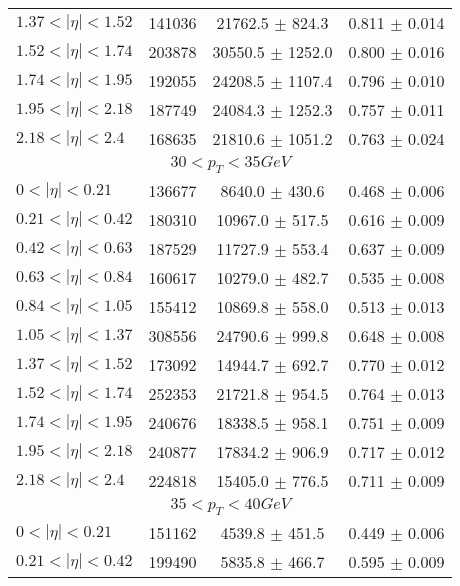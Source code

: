 \begin{tabular}{lccc}
$1.37 < |\eta| <1.52$          & 141036     & 21762.5    $\pm$ 824.3 & 0.811      $\pm$ 0.014 \\
$1.52 < |\eta| <1.74$          & 203878     & 30550.5    $\pm$ 1252.0 & 0.800      $\pm$ 0.016 \\
$1.74 < |\eta| <1.95$          & 192055     & 24208.5    $\pm$ 1107.4 & 0.796      $\pm$ 0.010 \\
$1.95 < |\eta| <2.18$          & 187749     & 24084.3    $\pm$ 1252.3 & 0.757      $\pm$ 0.011 \\
$2.18 < |\eta| <2.4$           & 168635     & 21810.6    $\pm$ 1051.2 & 0.763      $\pm$ 0.024 \\
\hline
\multicolumn{4}{c}{$30 < p_{T} < 35 GeV$} \\
\hline
$0 < |\eta| <0.21$             & 136677     & 8640.0     $\pm$ 430.6 & 0.468      $\pm$ 0.006 \\
$0.21 < |\eta| <0.42$          & 180310     & 10967.0    $\pm$ 517.5 & 0.616      $\pm$ 0.009 \\
$0.42 < |\eta| <0.63$          & 187529     & 11727.9    $\pm$ 553.4 & 0.637      $\pm$ 0.009 \\
$0.63 < |\eta| <0.84$          & 160617     & 10279.0    $\pm$ 482.7 & 0.535      $\pm$ 0.008 \\
$0.84 < |\eta| <1.05$          & 155412     & 10869.8    $\pm$ 558.0 & 0.513      $\pm$ 0.013 \\
$1.05 < |\eta| <1.37$          & 308556     & 24790.6    $\pm$ 999.8 & 0.648      $\pm$ 0.008 \\
$1.37 < |\eta| <1.52$          & 173092     & 14944.7    $\pm$ 692.7 & 0.770      $\pm$ 0.012 \\
$1.52 < |\eta| <1.74$          & 252353     & 21721.8    $\pm$ 954.5 & 0.764      $\pm$ 0.013 \\
$1.74 < |\eta| <1.95$          & 240676     & 18338.5    $\pm$ 958.1 & 0.751      $\pm$ 0.009 \\
$1.95 < |\eta| <2.18$          & 240877     & 17834.2    $\pm$ 906.9 & 0.717      $\pm$ 0.012 \\
$2.18 < |\eta| <2.4$           & 224818     & 15405.0    $\pm$ 776.5 & 0.711      $\pm$ 0.009 \\
\hline
\multicolumn{4}{c}{$35 < p_{T} < 40 GeV$} \\
\hline
$0 < |\eta| <0.21$             & 151162     & 4539.8     $\pm$ 451.5 & 0.449      $\pm$ 0.006 \\
$0.21 < |\eta| <0.42$          & 199490     & 5835.8     $\pm$ 466.7 & 0.595      $\pm$ 0.009 \\

\end{tabular}
